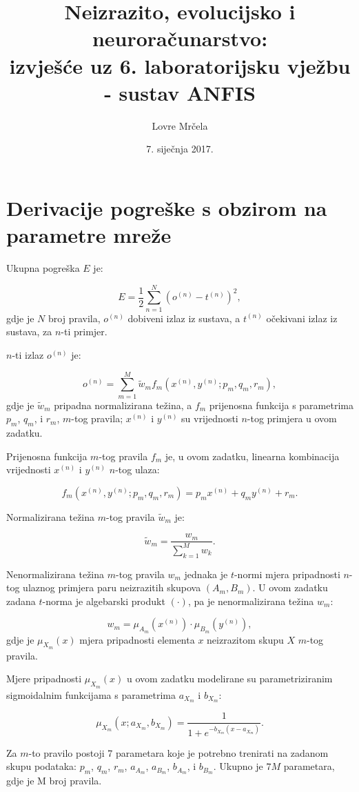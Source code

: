 \documentclass[12pt, a4paper]{article}
\title{Neizrazito, evolucijsko i neuroračunarstvo:\\
  izvješće uz 6. laboratorijsku vježbu - sustav ANFIS}
\author{Lovre Mrčela}
\date{7. siječnja 2017.}
\begin{document}
\maketitle

\section*{Derivacije pogreške s obzirom na parametre mreže}

Ukupna pogreška $E$ je:

$$ E = \dfrac{1}{2} \sum_{n=1}^{N} \left( o^{(n)} - t^{(n)} \right)^2, $$
gdje je $N$ broj pravila, $o^{(n)}$ dobiveni izlaz iz sustava, a $t^{(n)}$ očekivani izlaz iz sustava, za $n$-ti primjer.

$n$-ti izlaz $o^{(n)}$ je:

$$ o^{(n)} = \sum_{m=1}^{M} \widetilde{w}_m f_m \left( x^{(n)}, y^{(n)}; p_m, q_m, r_m \right), $$
gdje je $\widetilde{w}_m$ pripadna normalizirana težina, a $f_m$ prijenosna funkcija s parametrima $p_m$, $q_m$, i $r_m$, $m$-tog pravila; $x^{(n)}$ i $y^{(n)}$ su vrijednosti $n$-tog primjera u ovom zadatku.

Prijenosna funkcija $m$-tog pravila $f_m$ je, u ovom zadatku, linearna kombinacija vrijednosti $x^{(n)}$ i $y^{(n)}$ $n$-tog ulaza:

$$ f_m \left( x^{(n)}, y^{(n)}; p_m, q_m, r_m \right) = p_m x^{(n)} + q_m y^{(n)} + r_m. $$


Normalizirana težina $m$-tog pravila $\widetilde{w}_m$ je:

$$ \widetilde{w}_m = \dfrac{w_m}{\sum_{k=1}^{M} w_k}. $$

Nenormalizirana težina $m$-tog pravila $w_m$ jednaka je $t$-normi mjera pripadnosti $n$-tog ulaznog primjera paru neizrazitih skupova $(A_m, B_m)$. U ovom zadatku zadana $t$-norma je algebarski produkt $\left( \cdot \right)$, pa je nenormalizirana težina $w_m$:

$$ w_m = \mu_{A_m} \left( x^{(n)} \right) \cdot \mu_{B_m} \left( y^{(n)} \right), $$
gdje je $\mu_{X_m} \left( x \right)$ mjera pripadnosti elementa $x$ neizrazitom skupu $X$ $m$-tog pravila.

Mjere pripadnosti $\mu_{X_m} \left( x \right)$ u ovom zadatku modelirane su parametriziranim sigmoidalnim funkcijama s parametrima $a_{X_m}$ i $b_{X_m}$:

$$ \mu_{X_m} \left( x; a_{X_m}, b_{X_m} \right) = \dfrac{1}{1 + e^{-b_{X_m} \left( x - a_{X_m} \right)}}. $$

Za $m$-to pravilo postoji 7 parametara koje je potrebno trenirati na zadanom skupu podataka: $p_m$, $q_m$, $r_m$, $a_{A_m}$, $a_{B_m}$, $b_{A_m}$, i $b_{B_m}$. Ukupno je $7 M$ parametara, gdje je M broj pravila.
\end{document}

